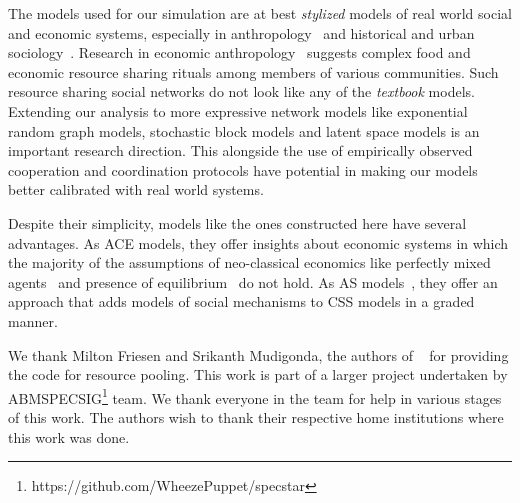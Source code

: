 The models used for our simulation are at best \textit{stylized} models of real world social and economic systems, especially in anthropology~\cite{white2011kinship} and historical and urban sociology~\cite{sampson2012great,katz2013people}. Research in economic anthropology~\cite{koster2019,koster2014,koster2015,bogerhoff2015,smith2019,nolin2012,power2018cooperation,power2018} suggests complex food and economic resource sharing rituals among members of various communities. Such resource sharing social networks do not look like any of the \textit{textbook} models. Extending our analysis to more expressive network models like exponential random graph models, stochastic block models and latent space models is an important research direction. This alongside the use of empirically observed cooperation and coordination protocols have potential in making our models better calibrated with real world systems.   

Despite their simplicity, models like the ones constructed here have several advantages.  As ACE models, they offer insights about economic systems in which the majority of the assumptions of neo-classical economics like perfectly mixed agents~\cite{wilhite} and presence of equilibrium~\cite{arthur} do not hold. As AS models~\cite{hedstrom2011oxford}, they offer an approach that adds models of social mechanisms to CSS models in a graded manner.  

\begin{acks}
We thank Milton Friesen and Srikanth Mudigonda, the authors of ~\cite{srimil} for providing the code for resource pooling. This work is part of a larger project undertaken by ABMSPECSIG\footnote{https://github.com/WheezePuppet/specstar} team. We thank everyone in the team for help in various stages of this work. The authors wish to thank their respective home institutions where this work was done.  
\end{acks}



